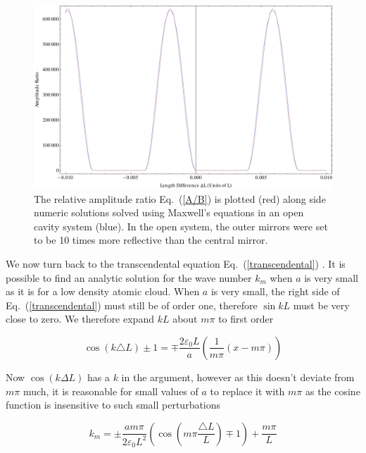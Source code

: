 \documentclass[twocolumn,english,pra,aps,superscriptaddress,floatfix]{revtex4-1}
\begin{document}
\begin{figure}
\includegraphics[width=1\columnwidth]{AmplitudeComparison10times}
\caption{The relative amplitude ratio Eq.\ (\ref{A/B}) is plotted (red) along side numeric solutions solved using Maxwell's equations in an open cavity system (blue).  In the open system, the outer mirrors were set to be 10 times more reflective than the central mirror.}
\label{fig:openvsclosed}
\end{figure}

We now turn back to the transcendental equation Eq.\ (\ref{transcendental}) . It is possible to find an analytic solution for the wave number $k_{m}$ when $a$
is very small as it is for a low density atomic cloud. When $a$ is very small, the right side of Eq.\ (\ref{transcendental}) must still
be of order one, therefore $\sin kL$ must be very close to zero. We therefore expand $kL$ about $m\pi$ to first order 

\begin{equation}
\cos(k\triangle L)\pm1=\mp\frac{2\varepsilon_{0}L}{a}\left(\frac{1}{m\pi}\left(x-m\pi\right)\right)
\label{transcendental2}
\end{equation}

Now $\cos(k\Delta L)$ has a $k$ in the argument, however as this doesn't deviate from $m\pi$ much, it is reasonable for small values of $a$
to replace it with $m\pi$ as the cosine function is insensitive to such small perturbations 

\begin{equation}
k_{m}=\pm\frac{a m\pi}{2\varepsilon_{0}L^{2}}\left(\cos(m\pi\frac{\triangle L}{L})\mp1\right)+\frac{m\pi}{L}
\label{wavenumber1}
\end{equation}
\end{document}
